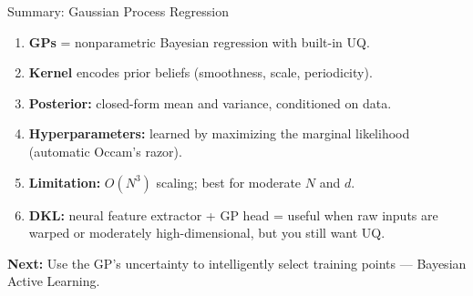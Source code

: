 \documentclass[aspectratio=169,11pt]{beamer}
\newcommand{\emphc}[1]{\textcolor{harvardcrimson}{#1}}
\begin{document}
\begin{frame}{Summary: Gaussian Process Regression}
\begin{enumerate}
  \item \textbf{GPs} = nonparametric Bayesian regression with \emphc{built-in UQ}.
  \item \textbf{Kernel} encodes prior beliefs (smoothness, scale, periodicity).
  \item \textbf{Posterior:} closed-form mean and variance, conditioned on data.
  \item \textbf{Hyperparameters:} learned by maximizing the marginal likelihood (automatic Occam's razor).
  \item \textbf{Limitation:} $O(N^3)$ scaling; best for moderate $N$ and $d$.
  \item \textbf{DKL:} neural feature extractor + GP head = useful when raw inputs are warped or moderately high-dimensional, but you still want UQ.
\end{enumerate}

\vspace{0.3cm}
\textbf{Next:} Use the GP's uncertainty to \emphc{intelligently select training points} --- Bayesian Active Learning.
\end{frame}

\end{document}
